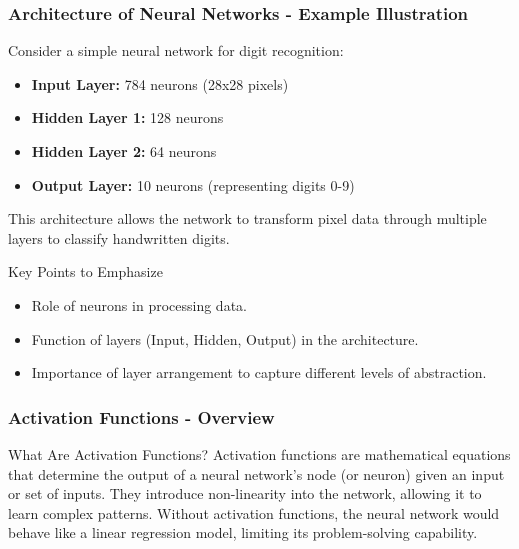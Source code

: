 \documentclass[aspectratio=169]{beamer}
\begin{document}
\begin{frame}[fragile]
    \frametitle{Architecture of Neural Networks - Example Illustration}
    Consider a simple neural network for digit recognition:
    \begin{itemize}
        \item \textbf{Input Layer:} 784 neurons (28x28 pixels)
        \item \textbf{Hidden Layer 1:} 128 neurons
        \item \textbf{Hidden Layer 2:} 64 neurons
        \item \textbf{Output Layer:} 10 neurons (representing digits 0-9)
    \end{itemize}
    
    This architecture allows the network to transform pixel data through multiple layers to classify handwritten digits.
    
    \begin{block}{Key Points to Emphasize}
        \begin{itemize}
            \item Role of neurons in processing data.
            \item Function of layers (Input, Hidden, Output) in the architecture.
            \item Importance of layer arrangement to capture different levels of abstraction.
        \end{itemize}
    \end{block}
\end{frame}

\begin{frame}[fragile]
    \frametitle{Activation Functions - Overview}
    \begin{block}{What Are Activation Functions?}
        Activation functions are mathematical equations that determine the output of a neural network's node (or neuron) given an input or set of inputs. 
        They introduce non-linearity into the network, allowing it to learn complex patterns.
        Without activation functions, the neural network would behave like a linear regression model, limiting its problem-solving capability.
    \end{block}
\end{frame}
\end{document}
